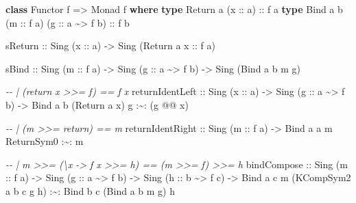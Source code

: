 \documentclass[]{article}
\newenvironment{Shaded}{}{}
\newcommand{\CommentTok}[1]{\textcolor[rgb]{0.38,0.63,0.69}{\textit{#1}}}
\newcommand{\DataTypeTok}[1]{\textcolor[rgb]{0.56,0.13,0.00}{#1}}
\newcommand{\KeywordTok}[1]{\textcolor[rgb]{0.00,0.44,0.13}{\textbf{#1}}}
\newcommand{\NormalTok}[1]{#1}
\newcommand{\OperatorTok}[1]{\textcolor[rgb]{0.40,0.40,0.40}{#1}}
\newcommand{\OtherTok}[1]{\textcolor[rgb]{0.00,0.44,0.13}{#1}}
\begin{document}
\begin{Shaded}
\begin{Highlighting}[]
\KeywordTok{class} \DataTypeTok{Functor}\NormalTok{ f }\OtherTok{=>} \DataTypeTok{Monad}\NormalTok{ f }\KeywordTok{where}
    \KeywordTok{type} \DataTypeTok{Return}\NormalTok{ a   (}\OtherTok{x ::}\NormalTok{ a)}\OtherTok{                   ::}\NormalTok{ f a}
    \KeywordTok{type} \DataTypeTok{Bind}\NormalTok{   a b (}\OtherTok{m ::}\NormalTok{ f a) (}\OtherTok{g ::}\NormalTok{ a }\OperatorTok{\textasciitilde{}>}\NormalTok{ f b)}\OtherTok{ ::}\NormalTok{ f b}

\NormalTok{    sReturn}
\OtherTok{        ::} \DataTypeTok{Sing}\NormalTok{ (}\OtherTok{x ::}\NormalTok{ a)}
        \OtherTok{{-}>} \DataTypeTok{Sing}\NormalTok{ (}\DataTypeTok{Return}\NormalTok{ a}\OtherTok{ x ::}\NormalTok{ f a)}

\NormalTok{    sBind}
\OtherTok{        ::} \DataTypeTok{Sing}\NormalTok{ (}\OtherTok{m ::}\NormalTok{ f a)}
        \OtherTok{{-}>} \DataTypeTok{Sing}\NormalTok{ (}\OtherTok{g ::}\NormalTok{ a }\OperatorTok{\textasciitilde{}>}\NormalTok{ f b)}
        \OtherTok{{-}>} \DataTypeTok{Sing}\NormalTok{ (}\DataTypeTok{Bind}\NormalTok{ a b m g)}

    \CommentTok{{-}{-} | (return x >>= f) == f x}
\NormalTok{    returnIdentLeft}
\OtherTok{        ::} \DataTypeTok{Sing}\NormalTok{ (}\OtherTok{x ::}\NormalTok{ a)}
        \OtherTok{{-}>} \DataTypeTok{Sing}\NormalTok{ (}\OtherTok{g ::}\NormalTok{ a }\OperatorTok{\textasciitilde{}>}\NormalTok{ f b)}
        \OtherTok{{-}>} \DataTypeTok{Bind}\NormalTok{ a b (}\DataTypeTok{Return}\NormalTok{ a x) g }\OperatorTok{:\textasciitilde{}:}\NormalTok{ (g }\OperatorTok{@@}\NormalTok{ x)}

    \CommentTok{{-}{-} | (m >>= return) == m}
\NormalTok{    returnIdentRight}
\OtherTok{        ::} \DataTypeTok{Sing}\NormalTok{ (}\OtherTok{m ::}\NormalTok{ f a)}
        \OtherTok{{-}>} \DataTypeTok{Bind}\NormalTok{ a a m }\DataTypeTok{ReturnSym0} \OperatorTok{:\textasciitilde{}:}\NormalTok{ m}

    \CommentTok{{-}{-} | m >>= (\textbackslash{}x {-}> f x >>= h) == (m >>= f) >>= h}
\NormalTok{    bindCompose}
\OtherTok{        ::} \DataTypeTok{Sing}\NormalTok{ (}\OtherTok{m ::}\NormalTok{ f a)}
        \OtherTok{{-}>} \DataTypeTok{Sing}\NormalTok{ (}\OtherTok{g ::}\NormalTok{ a }\OperatorTok{\textasciitilde{}>}\NormalTok{ f b)}
        \OtherTok{{-}>} \DataTypeTok{Sing}\NormalTok{ (}\OtherTok{h ::}\NormalTok{ b }\OperatorTok{\textasciitilde{}>}\NormalTok{ f c)}
        \OtherTok{{-}>} \DataTypeTok{Bind}\NormalTok{ a c m (}\DataTypeTok{KCompSym2}\NormalTok{ a b c g h) }\OperatorTok{:\textasciitilde{}:} \DataTypeTok{Bind}\NormalTok{ b c (}\DataTypeTok{Bind}\NormalTok{ a b m g) h}


\end{Highlighting}
\end{Shaded}
\end{document}
